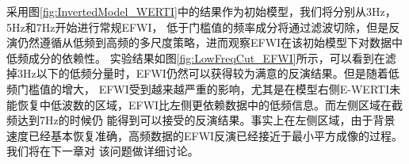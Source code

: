 采用图\ref{fig:InvertedModel_WERTI}中的结果作为初始模型，我们将分别从3Hz，5Hz和7Hz开始进行常规EFWI，
低于门槛值的频率成分将通过滤波切除，但是反演仍然遵循从低频到高频的多尺度策略，进而观察EFWI在该初始模型下对数据中低频成分的依赖性。
实验结果如图\ref{fig:LowFreqCut_EFWI}所示，可以看到在滤掉3Hz以下的低频分量时，EFWI仍然可以获得较为满意的反演结果。但是随着低频门槛值的增大，
EFWI受到越来越严重的影响，尤其是在模型右侧E-WERTI未能恢复中低波数的区域，EFWI比左侧更依赖数据中的低频信息。而左侧区域在截频达到7Hz的时候仍
能得到可以接受的反演结果。事实上在左侧区域，由于背景速度已经基本恢复准确，高频数据的EFWI反演已经接近于最小平方成像的过程。我们将在下一章对
该问题做详细讨论。
\begin{figure}[!htb]
   \centering
   \\
   \\

\end{figure}
